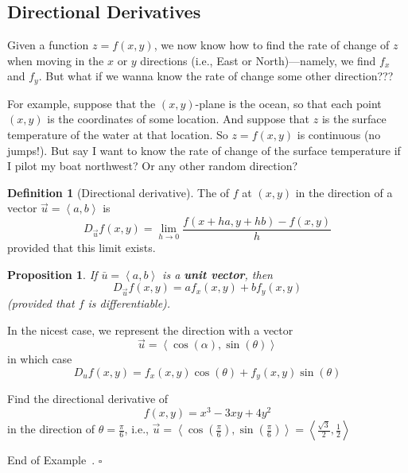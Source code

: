 \documentclass[10pt]{article}
\newtheorem{proposition}[theorem]{Proposition}
\theoremstyle{definition}
\newtheorem{definition}[theorem]{Definition}
\newtheorem{example}[theorem]{Example}
\renewenvironment{example}
{\begin{oldexample}}
  {\par\smallskip\hfill   End of Example~\theexample. $\square$    \par\end{oldexample}}
\newcommand{\1}[1]{\textbf{1}_{\left[#1\right]}} %
\newcommand{\dempfcolor}[1]{{\color{RoyalBlue}#1}}
\newcommand{\demph}[1]{\dempfcolor{{\sl #1}}}
\begin{document}
\subsection{Directional Derivatives}
Given a function $z=f(x,y)$, we now know how to find the rate of change of $z$
when moving in the $x$ or $y$ directions (i.e., East or North)---namely, we find  $f_{x}$ and
$f_{y}$. But what if we wanna know the rate of change some other direction???

For example, suppose that the $(x,y)$-plane is the ocean, so that each point
$(x,y)$ is the coordinates of some location. And suppose that $z$ is the
surface temperature of the water at that location. So $z=f(x,y)$ is continuous
(no jumps!). But say I want to know the rate of change of the surface
temperature if I pilot my boat northwest? Or any other random direction?


\begin{definition}[Directional derivative]
  The \demph{directional derivative} of $f$ at $(x,y)$ in the
  direction of a vector $\vec{u}=\left\langle a,b \right\rangle$ is
  \begin{equation*}
    D_{\vec{u}}f(x,y) = \lim_{h \to 0} \frac{f(x+ha,y+hb)-f(x,y)}{h} 
  \end{equation*}
  provided that this limit exists.
\end{definition}

\begin{proposition}
  If $\bar{u} = \left\langle a,b \right\rangle$ is a \textbf{unit vector}, then
  \begin{equation*}
    D_{\vec{u}}f(x,y) = af_{x}(x,y)+ bf_{y}(x,y)
  \end{equation*}
  (provided that $f$ is differentiable).
\end{proposition}

In the nicest case, we represent the direction with a vector
\begin{equation*}
  \vec{u} = \left\langle \cos(\alpha),\sin(\theta) \right\rangle 
\end{equation*}
in which case
\begin{equation*}
  D_{u}f(x,y) = f_{x}(x,y)\cos(\theta)+f_{y}(x,y)\sin(\theta)
\end{equation*}

\begin{example}
  Find the directional derivative of
  \begin{equation*}
    f(x,y) = x^{3}-3xy+4y^{2}
  \end{equation*}
  in the direction of $\theta=\frac{\pi}{6}$, i.e., $\vec{u} = \left\langle
    \cos(\frac{\pi}{6}),\sin(\frac{\pi}{6}) \right\rangle  = \left\langle \frac{\sqrt{3}}{2},\frac{1}{2} \right\rangle $
\end{example}
\end{document}
